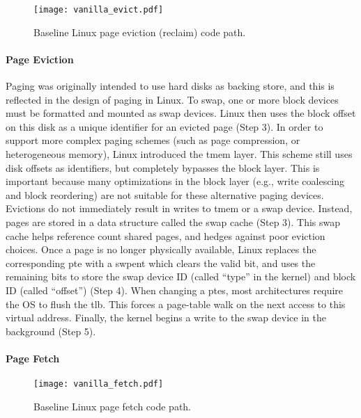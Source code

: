 \begin{figure}[h] \centering
  \texttt{[image: vanilla\_evict.pdf]}
  \caption{Baseline Linux page eviction (reclaim) code path.}
  \label{fig:vanilla_evict}
\end{figure}

\paragraph{Page Eviction}
Paging was originally intended to use hard disks as backing store, and this is
reflected in the design of paging in Linux. To swap, one or more block
devices must be formatted and mounted as swap devices. Linux then uses the
block offset on this disk as a unique identifier for an evicted page (Step 3). In
order to support more complex paging schemes (such as page compression, or
heterogeneous memory), Linux introduced the \gls{tmem} layer\cite{tmem}. This
scheme still uses disk offsets as identifiers, but completely bypasses the block
layer. This is important because many optimizations in the block layer (e.g.,
write coalescing and block reordering) are not suitable for these alternative
paging devices. Evictions do not immediately result in writes to \gls{tmem} or
a swap device. Instead, pages are stored in a data structure called the swap
cache (Step 3). This swap cache helps reference count shared pages, and hedges
against poor eviction choices. Once a page is no longer physically available,
Linux replaces the corresponding \gls{pte} with a \gls{swpent} which clears the
valid bit, and uses the remaining bits to store the swap device ID (called
``type'' in the kernel) and block ID (called ``offset'') (Step 4).  When
changing a \glspl{pte}, most architectures require the OS to flush the
\gls{tlb}. This forces a page-table walk on the next access to this virtual
address. Finally, the kernel begins a write to the swap device in the
background (Step 5).

\paragraph{Page Fetch}

\begin{figure}[h] \centering
  \texttt{[image: vanilla\_fetch.pdf]}
  \caption{Baseline Linux page fetch code path.}
  \label{fig:vanilla_fetch}
\end{figure}

